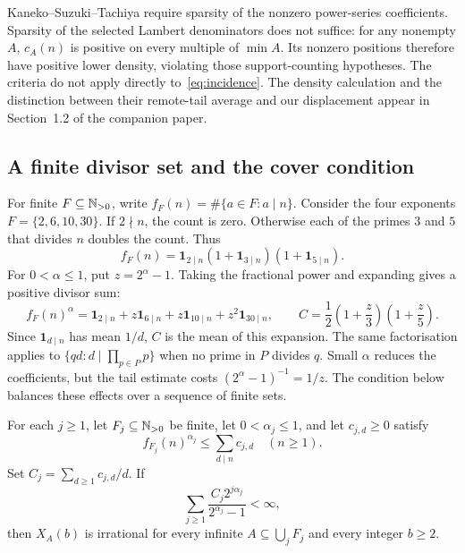 \documentclass[11pt]{article}
\begin{document}
Kaneko--Suzuki--Tachiya
\cite[Theorems~1 and~3]{kanekosuzukitachiya} require sparsity of the
nonzero power-series coefficients. Sparsity of the selected Lambert
denominators does not suffice: for any nonempty $A$, $c_A(n)$ is positive
on every multiple of $\min A$. Its nonzero positions therefore have
positive lower density, violating those support-counting hypotheses.
The criteria do not apply directly to~\eqref{eq:incidence}.
The density calculation and the distinction between their remote-tail
average and our displacement appear in
{Section~1.2 of the companion paper}.


\subsection{A finite divisor set and the cover condition}
For finite $F\subseteq\mathbb{N}_{>0}$, write $f_F(n)=\#\{a\in F:a\mid n\}$.
Consider the four exponents $F=\{2,6,10,30\}$. If $2\nmid n$, the
count is zero. Otherwise each of the primes $3$ and $5$ that divides
$n$ doubles the count. Thus
\[
 f_F(n)=\mathbf1_{2\mid n}(1+\mathbf1_{3\mid n})(1+\mathbf1_{5\mid n}).
\]
For $0<\alpha\le1$, put $z=2^\alpha-1$. Taking the fractional power
and expanding gives a positive divisor sum:
\[
 f_F(n)^\alpha
 =\mathbf1_{2\mid n}+z\mathbf1_{6\mid n}
  +z\mathbf1_{10\mid n}+z^2\mathbf1_{30\mid n},\qquad
 C=\frac12\left(1+\frac z3\right)\left(1+\frac z5\right).
\]
Since $\mathbf1_{d\mid n}$ has mean $1/d$, $C$ is the mean of this
expansion. The same factorisation applies to
$\{qd:d\mid\prod_{p\in P}p\}$ when no prime in $P$ divides $q$.
Small $\alpha$ reduces the coefficients, but the tail estimate costs
$(2^\alpha-1)^{-1}=1/z$. The condition below balances these effects
over a sequence of finite sets.

\begin{theorem}\label{thm:variable-fractional-cover}
For each $j\ge1$, let $F_j\subseteq\mathbb{N}_{>0}$ be finite, let
$0<\alpha_j\le1$, and let $c_{j,d}\ge0$ satisfy
\[
 f_{F_j}(n)^{\alpha_j}\le\sum_{d\mid n}c_{j,d}\quad(n\ge1).
\]
Set $C_j=\sum_{d\ge1}c_{j,d}/d$.  If
\begin{equation*}
 \sum_{j\ge1}\frac{C_j2^{j\alpha_j}}{2^{\alpha_j}-1}<\infty,
 \tag{V}\label{eq:strengthened-cover}
\end{equation*}
then $X_A(b)$ is irrational for every infinite
$A\subseteq\bigcup_jF_j$ and every integer $b\ge2$.
\end{theorem}
\end{document}
